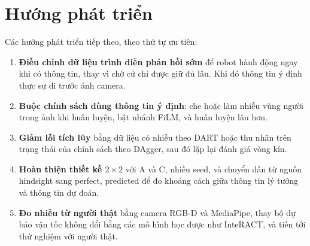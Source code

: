 \section{Hướng phát triển}

Các hướng phát triển tiếp theo, theo thứ tự ưu tiên:
\begin{enumerate}
  \item \textbf{Điều chỉnh dữ liệu trình diễn phản hồi sớm} để robot hành động ngay khi có thông tin, thay vì chờ cử chỉ được giữ đủ lâu. Khi đó thông tin ý định thực sự đi trước ảnh camera.
  \item \textbf{Buộc chính sách dùng thông tin ý định}: che hoặc làm nhiễu vùng người trong ảnh khi huấn luyện, bật nhánh FiLM, và huấn luyện lâu hơn.
  \item \textbf{Giảm lỗi tích lũy} bằng dữ liệu có nhiễu theo DART hoặc thu nhãn trên trạng thái của chính sách theo DAgger, sau đó lặp lại đánh giá vòng kín.
  \item \textbf{Hoàn thiện thiết kế $2\times2$} với A và C, nhiều seed, và chuyển dần từ nguồn hindsight sang perfect, predicted để đo khoảng cách giữa thông tin lý tưởng và thông tin dự đoán.
  \item \textbf{Đo nhiễu từ người thật} bằng camera RGB-D và MediaPipe, thay bộ dự báo vận tốc không đổi bằng các mô hình học được như InteRACT, và tiến tới thử nghiệm với người thật.
\end{enumerate}
